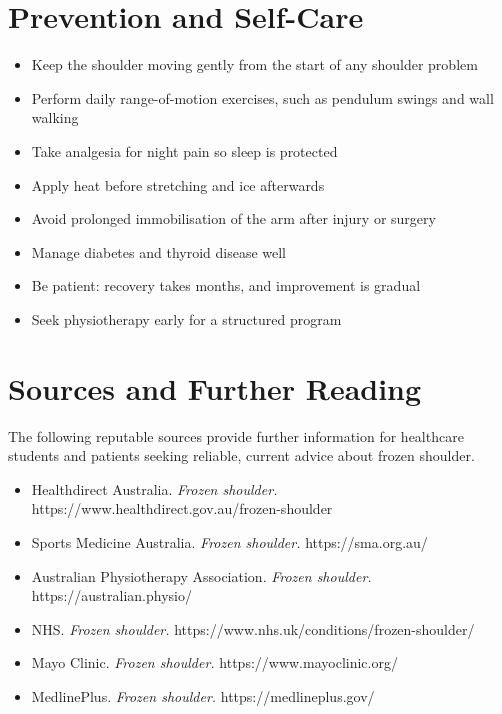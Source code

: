 \section*{Prevention and Self-Care}
\begin{itemize}
    \item Keep the shoulder moving gently from the start of any shoulder problem
    \item Perform daily range-of-motion exercises, such as pendulum swings and wall walking
    \item Take analgesia for night pain so sleep is protected
    \item Apply heat before stretching and ice afterwards
    \item Avoid prolonged immobilisation of the arm after injury or surgery
    \item Manage diabetes and thyroid disease well
    \item Be patient: recovery takes months, and improvement is gradual
    \item Seek physiotherapy early for a structured program
\end{itemize}

\section*{Sources and Further Reading}
The following reputable sources provide further information for healthcare students and patients seeking reliable, current advice about frozen shoulder.
\begin{itemize}
    \item Healthdirect Australia. \textit{Frozen shoulder.} https://www.healthdirect.gov.au/frozen-shoulder
    \item Sports Medicine Australia. \textit{Frozen shoulder.} https://sma.org.au/
    \item Australian Physiotherapy Association. \textit{Frozen shoulder.} https://australian.physio/
    \item NHS. \textit{Frozen shoulder.} https://www.nhs.uk/conditions/frozen-shoulder/
    \item Mayo Clinic. \textit{Frozen shoulder.} https://www.mayoclinic.org/
    \item MedlinePlus. \textit{Frozen shoulder.} https://medlineplus.gov/
\end{itemize}
